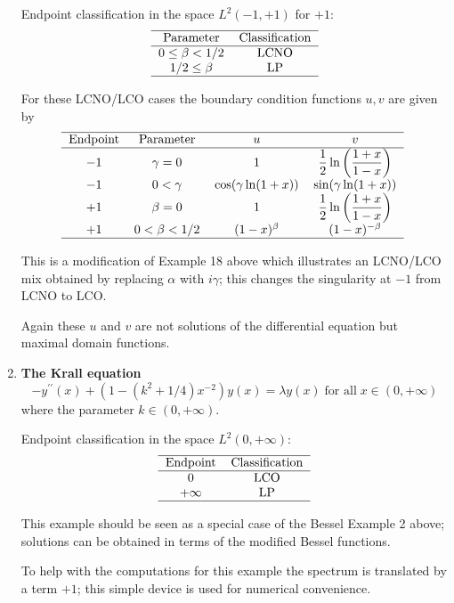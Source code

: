 \documentclass[12pt]{amsart}%
\theoremstyle{plain}
\numberwithin{equation}{section}
\begin{document}
\begin{enumerate}
Endpoint classification in the space $L^{2}(-1,+1)$ for $+1$:%
\[%
\begin{tabular}
[c]{cc}\hline
Parameter & Classification\\\hline
$0\leq\beta<1/2$ & LCNO\\
$1/2\leq\beta$ & LP\\\hline
\end{tabular}
\]

For these LCNO/LCO cases the boundary condition functions $u,v$ are given by%
\[%
\begin{tabular}
[c]{cccc}\hline
Endpoint & Parameter & $u$ & $v$\\\hline
$-1$ & $\gamma=0$ & $1$ & $\dfrac{1}{2}\ln\left(  \dfrac{1+x}{1-x}\right)  $\\
$-1$ & $0<\gamma$ & $\cos(\gamma\ln(1+x))$ & $\sin(\gamma\ln(1+x))$\\
$+1$ & $\beta=0$ & $1$ & $\dfrac{1}{2}\ln\left(  \dfrac{1+x}{1-x}\right)  $\\
$+1$ & $0<\beta<1/2$ & $(1-x)^{\beta}$ & $(1-x)^{-\beta}$\\\hline
\end{tabular}
\
\]

This is a modification of Example 18 above which illustrates an LCNO/LCO mix
obtained by replacing $\alpha$ with $i\gamma$; this changes the singularity at
$-1$ from LCNO to LCO.

Again these $u$ and $v$ are not solutions of the differential equation but
maximal domain functions.

\item \textbf{The Krall equation}%
\[
-y^{\prime\prime}(x)+(1-(k^{2}+1/4)x^{-2})y(x)=\lambda y(x)\;\text{for
all}\;x\in(0,+\infty)
\]
where the parameter $k\in(0,+\infty).$

Endpoint classification in the space $L^{2}(0,+\infty)$:%
\[%
\begin{tabular}
[c]{cc}\hline
Endpoint & Classification\\\hline
$0$ & LCO\\
$+\infty$ & LP\\\hline
\end{tabular}
\]

This example should be seen as a special case of the Bessel Example 2 above;
solutions can be obtained in terms of the modified Bessel functions.

To help with the computations for this example the spectrum is translated by a
term $+1$; this simple device is used for numerical convenience.


\end{enumerate}
\end{document}
